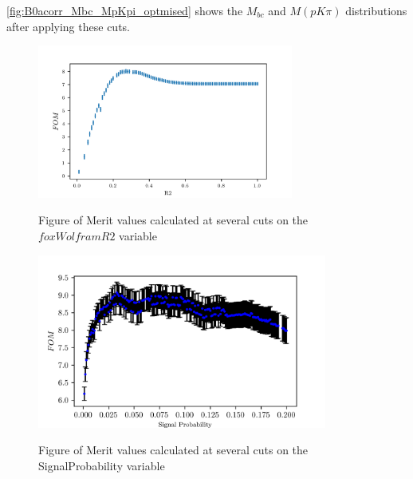 \cref{fig:B0acorr_Mbc_MpKpi_optmised} shows the  $M_{bc} $ and $M(p K \pi)$ distributions after applying these cuts.
\begin{figure}[h!]
    {\includegraphics[width=0.75\textwidth]{03-Selection/figs/acorr_chargedB_FOMvsR2_cut.png}}
    \caption{Figure of Merit values calculated at several cuts on the $foxWolframR2$ variable}
    \label{fig:acorr_chargedB_FOMvsR2_cut}
    \end{figure}



\begin{figure}[h!]
    {\includegraphics[width=0.85\textwidth]{03-Selection/figs/acorr_B0_FOMvsSigProb_cut.png}}
    \caption{Figure of Merit values calculated at several cuts on the SignalProbability variable}
    \label{fig:acorr_neutralB_FOMvsR2_cut}
    \end{figure}

\newpage

